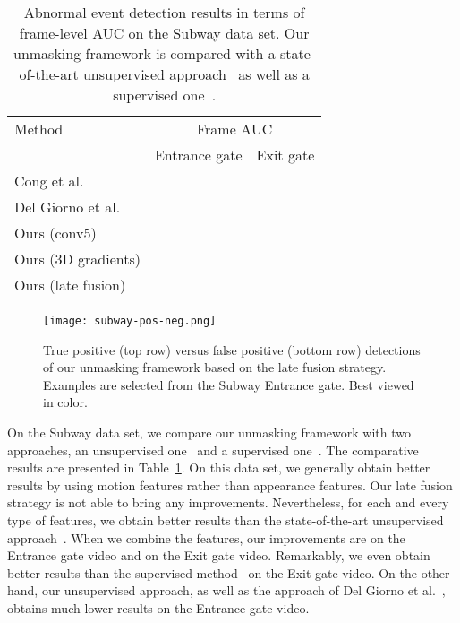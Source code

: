 \documentclass[10pt,twocolumn,letterpaper]{article}
\begin{document}
\begin{table}[t]
\small{
\begin{center}
\begin{tabular}{|l|c|c|}
\hline
Method 																& \multicolumn{2}{|c|}{Frame AUC} \\
\cline{2-3}
			 																& Entrance gate  		& Exit gate\\
\hline
\hline
Cong et al.~\cite{Cong-CVPR-2011}					& 			&  \\
Del Giorno et al.~\cite{Giorno-ECCV-2016}			& 			&  \\
\hline
Ours (conv5)														& 			& \\
Ours (3D gradients)												& 			&  \\
Ours (late fusion)													& 			&  \\
\hline
\end{tabular}
\end{center}
}
\vspace*{-0.1cm}
\caption{Abnormal event detection results in terms of frame-level AUC on the Subway data set. Our unmasking framework is compared with a state-of-the-art unsupervised approach~\cite{Giorno-ECCV-2016} as well as a supervised one~\cite{Cong-CVPR-2011}.}
\label{tab_Subway}
\vspace*{-0.1cm}
\end{table}

\begin{figure}
\begin{center}
\texttt{[image: subway-pos-neg.png]}
\end{center}
\vspace*{-0.3cm}
\caption{True positive (top row) versus false positive (bottom row) detections of our unmasking framework based on the late fusion strategy. Examples are selected from the Subway Entrance gate. Best viewed in color.}
\label{fig_Subway_pos_neg}
\vspace*{-0.3cm}
\end{figure}

On the Subway data set, we compare our unmasking framework with two approaches, an unsupervised one~\cite{Giorno-ECCV-2016} and a supervised one~\cite{Cong-CVPR-2011}. The comparative results are presented in Table~\ref{tab_Subway}. On this data set, we generally obtain better results by using motion features rather than appearance features. Our late fusion strategy is not able to bring any improvements. Nevertheless, for each and every type of features, we obtain better results than the state-of-the-art unsupervised approach~\cite{Giorno-ECCV-2016}. When we combine the features, our improvements are  on the Entrance gate video and  on the Exit gate video. Remarkably, we even obtain better results than the supervised method~\cite{Cong-CVPR-2011} on the Exit gate video. On the other hand, our unsupervised approach, as well as the approach of Del Giorno et al.~\cite{Giorno-ECCV-2016}, obtains much lower results on the Entrance gate video.
\end{document}

